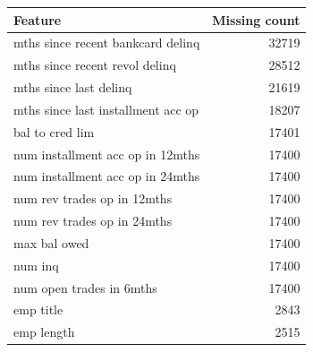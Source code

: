 \begin{tabular}{lr}
\toprule
Feature & Missing count \\
\midrule
mths since recent bankcard delinq & 32719 \\
mths since recent revol delinq & 28512 \\
mths since last delinq & 21619 \\
mths since last installment acc op & 18207 \\
bal to cred lim & 17401 \\
num installment acc op in 12mths & 17400 \\
num installment acc op in 24mths & 17400 \\
num rev trades op in 12mths & 17400 \\
num rev trades op in 24mths & 17400 \\
max bal owed & 17400 \\
num inq & 17400 \\
num open trades in 6mths & 17400 \\
emp title & 2843 \\
emp length & 2515 \\
\bottomrule
\end{tabular}
